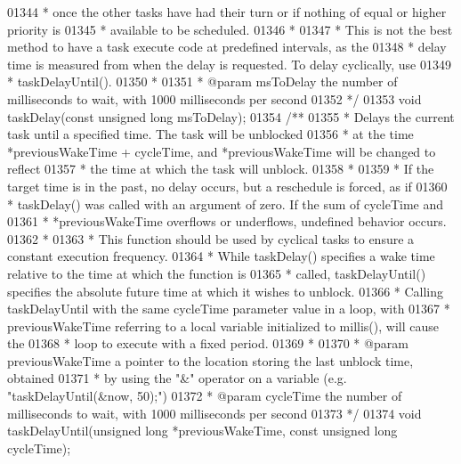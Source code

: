 \begin{DoxyCode}
{{{{{{{{{01344 \textcolor{comment}{ * once the other tasks have had their turn or if nothing of equal or higher priority is}
01345 \textcolor{comment}{ * available to be scheduled.}
01346 \textcolor{comment}{ *}
01347 \textcolor{comment}{ * This is not the best method to have a task execute code at predefined intervals, as the}
01348 \textcolor{comment}{ * delay time is measured from when the delay is requested. To delay cyclically, use}
01349 \textcolor{comment}{ * taskDelayUntil().}
01350 \textcolor{comment}{ *}
01351 \textcolor{comment}{ * @param msToDelay the number of milliseconds to wait, with 1000 milliseconds per second}
01352 \textcolor{comment}{ */}
01353 \textcolor{keywordtype}{void} taskDelay(\textcolor{keyword}{const} \textcolor{keywordtype}{unsigned} \textcolor{keywordtype}{long} msToDelay);
01354 \textcolor{comment}{/**}
01355 \textcolor{comment}{ * Delays the current task until a specified time. The task will be unblocked}
01356 \textcolor{comment}{ * at the time *previousWakeTime + cycleTime, and *previousWakeTime will be changed to reflect}
01357 \textcolor{comment}{ * the time at which the task will unblock.}
01358 \textcolor{comment}{ *}
01359 \textcolor{comment}{ * If the target time is in the past, no delay occurs, but a reschedule is forced, as if}
01360 \textcolor{comment}{ * taskDelay() was called with an argument of zero. If the sum of cycleTime and}
01361 \textcolor{comment}{ * *previousWakeTime overflows or underflows, undefined behavior occurs.}
01362 \textcolor{comment}{ *}
01363 \textcolor{comment}{ * This function should be used by cyclical tasks to ensure a constant execution frequency.}
01364 \textcolor{comment}{ * While taskDelay() specifies a wake time relative to the time at which the function is}
01365 \textcolor{comment}{ * called, taskDelayUntil() specifies the absolute future time at which it wishes to unblock.}
01366 \textcolor{comment}{ * Calling taskDelayUntil with the same cycleTime parameter value in a loop, with}
01367 \textcolor{comment}{ * previousWakeTime referring to a local variable initialized to millis(), will cause the}
01368 \textcolor{comment}{ * loop to execute with a fixed period.}
01369 \textcolor{comment}{ *}
01370 \textcolor{comment}{ * @param previousWakeTime a pointer to the location storing the last unblock time, obtained}
01371 \textcolor{comment}{ * by using the "&" operator on a variable (e.g. "taskDelayUntil(&now, 50);")}
01372 \textcolor{comment}{ * @param cycleTime the number of milliseconds to wait, with 1000 milliseconds per second}
01373 \textcolor{comment}{ */}
01374 \textcolor{keywordtype}{void} taskDelayUntil(\textcolor{keywordtype}{unsigned} \textcolor{keywordtype}{long} *previousWakeTime, \textcolor{keyword}{const} \textcolor{keywordtype}{unsigned} \textcolor{keywordtype}{long} cycleTime);
}}}}}}}}}
\end{DoxyCode}
